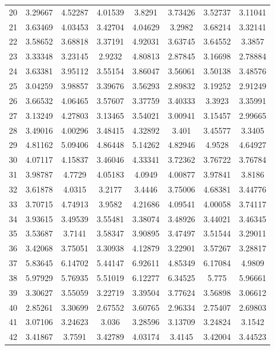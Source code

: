 \begin{center}
\begin{longtable}{cccccccc}
20 & 3.29667 & 4.52287 & 4.01539 & 3.8291 & 3.73426 & 3.52737 & 3.11041\\
21 & 3.63469 & 4.03453 & 3.42704 & 4.04629 & 3.2982 & 3.68214 & 3.32141\\
22 & 3.58652 & 3.68818 & 3.37191 & 4.92031 & 3.63745 & 3.64552 & 3.3857\\
23 & 3.33348 & 3.23145 & 2.9232 & 4.80813 & 2.87845 & 3.16698 & 2.78884\\
24 & 3.63381 & 3.95112 & 3.55154 & 3.86047 & 3.56061 & 3.50138 & 3.48576\\
25 & 3.04259 & 3.98857 & 3.39676 & 3.56293 & 2.89832 & 3.19252 & 2.91249\\
26 & 3.66532 & 4.06465 & 3.57607 & 3.37759 & 3.40333 & 3.3923 & 3.35991\\
27 & 3.13249 & 4.27803 & 3.13465 & 3.54021 & 3.00941 & 3.15457 & 2.99665\\
28 & 3.49016 & 4.00296 & 3.48415 & 4.32892 & 3.401 & 3.45577 & 3.3405\\
29 & 4.81162 & 5.09406 & 4.86448 & 5.14262 & 4.82946 & 4.9528 & 4.64927\\
30 & 4.07117 & 4.15837 & 3.46046 & 4.33341 & 3.72362 & 3.76722 & 3.76784\\
31 & 3.98787 & 4.7729 & 4.05183 & 4.0949 & 4.00877 & 3.97841 & 3.8186\\
32 & 3.61878 & 4.0315 & 3.2177 & 3.4446 & 3.75006 & 4.68381 & 3.44776\\
33 & 3.70715 & 4.74913 & 3.9582 & 4.21686 & 4.09541 & 4.00058 & 3.74117\\
34 & 3.93615 & 3.49539 & 3.55481 & 3.38074 & 3.48926 & 3.44021 & 3.46345\\
35 & 3.53687 & 3.7141 & 3.58347 & 3.90895 & 3.47497 & 3.51544 & 3.29011\\
36 & 3.42068 & 3.75051 & 3.30938 & 4.12879 & 3.22901 & 3.57267 & 3.28817\\
37 & 5.83645 & 6.14702 & 5.44147 & 6.92611 & 4.85349 & 6.17084 & 4.9809\\
38 & 5.97929 & 5.76935 & 5.51019 & 6.12277 & 6.34525 & 5.775 & 5.96661\\
39 & 3.30627 & 3.55059 & 3.22719 & 3.39504 & 3.77624 & 3.56898 & 3.06612\\
40 & 2.85261 & 3.30699 & 2.67552 & 3.60765 & 2.96334 & 2.75407 & 2.69803\\
41 & 3.07106 & 3.24623 & 3.036 & 3.28596 & 3.13709 & 3.24824 & 3.1542\\
42 & 3.41867 & 3.7591 & 3.42789 & 4.03174 & 3.4145 & 3.42004 & 3.44523\\

\end{longtable}
\end{center}
